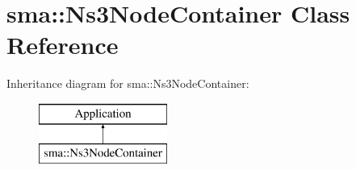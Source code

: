 \hypertarget{classsma_1_1Ns3NodeContainer}{\section{sma\-:\-:Ns3\-Node\-Container Class Reference}
\label{classsma_1_1Ns3NodeContainer}
}
Inheritance diagram for sma\-:\-:Ns3\-Node\-Container\-:\begin{figure}[H]
\begin{center}
\leavevmode
\includegraphics[height=2.000000cm]{classsma_1_1Ns3NodeContainer}
\end{center}
\end{figure}

